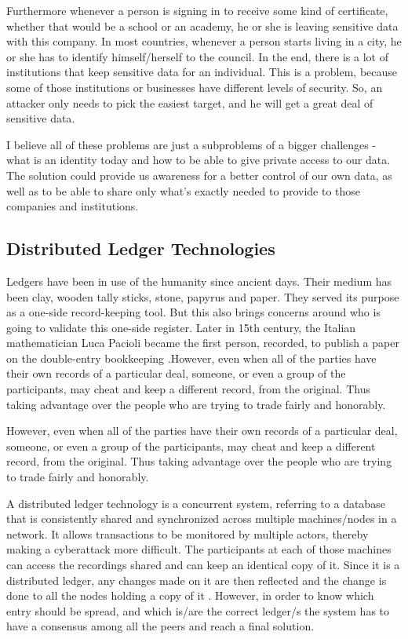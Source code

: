 \documentclass[a4paper,11pt]{report}
\begin{document}
Furthermore whenever a person is signing in to receive some kind of certificate, whether that would be a school or an academy, he or she is leaving sensitive data with this company. In most countries, whenever a person starts living in a city, he or she has to identify himself/herself to the council. In the end, there is a lot of institutions that keep sensitive data for an individual. This is a problem, because some of those institutions or businesses have different levels of security. So, an attacker only needs to pick the easiest target, and he will get a great deal of sensitive data. 

	I believe all of these problems are just a subproblems of a bigger challenges - what is an identity today and how to be able to give private access to our data. The solution could provide us awareness for a better control of our own data, as well as to be able to share only what’s exactly needed to provide to those companies and institutions.

\subsection{Distributed Ledger Technologies}

\label{dlt}

Ledgers have been in use of the humanity since ancient days. Their medium has been clay, wooden tally sticks, stone, papyrus and paper. They served its purpose as a one-side record-keeping tool. But this also brings concerns around who is going to validate this one-side register. Later in 15th century, the Italian mathematician Luca Pacioli became the first person, recorded, to publish a paper on the double-entry bookkeeping \cite{ledgers}.However, even when all of the parties have their own records of a particular deal, someone, or even a group of the participants, may cheat and keep a different record, from the original. Thus taking advantage over the people who are trying to trade fairly and honorably.

However, even when all of the parties have their own records of a particular deal, someone, or even a group of the participants, may cheat and keep a different record, from the original. Thus taking advantage over the people who are trying to trade fairly and honorably.

A distributed ledger technology is a concurrent system, referring to a database that is consistently shared and synchronized across multiple machines/nodes in a network. It allows transactions to be monitored by multiple actors, thereby making a cyberattack more difficult. The participants at each of those machines can access the recordings shared and can keep an identical copy of it. Since it is a distributed ledger, any changes made on it are then reflected and the change is done to all the nodes holding a copy of it \cite{dltref} . However, in order to know which entry should be spread, and which is/are the correct ledger/s the system has to have a consensus among all the peers and reach a final solution.
\end{document}
